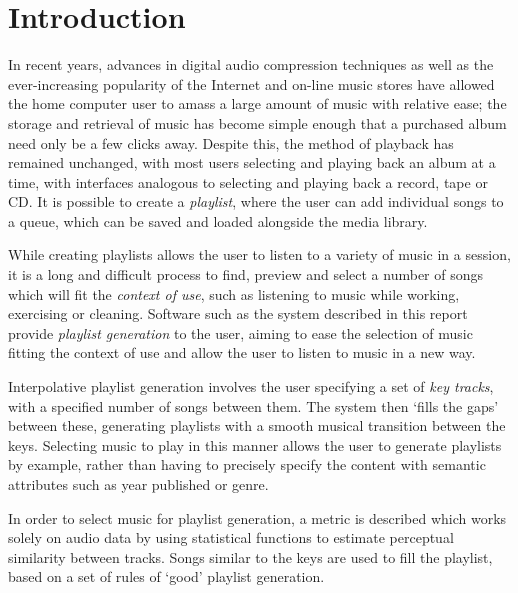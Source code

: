 \chapter{Introduction}
\begin{comment}
	\item rationale
	\item purpose
	\item issues
	\item context
	\item relevance
	\item structure of dissertation
\end{comment}
In recent years, advances in digital audio compression techniques as well as the ever-increasing popularity of the Internet and on-line music stores have allowed the home computer user to amass a large amount of music with relative ease; the storage and retrieval of music has become simple enough that a purchased album need only be a few clicks away. Despite this, the method of playback has remained unchanged, with most users selecting and playing back an album at a time, with interfaces analogous to selecting and playing back a record, tape or CD. It is possible to create a \emph{playlist}, where the user can add individual songs to a queue, which can be saved and loaded alongside the media library.

While creating playlists allows the user to listen to a variety of music in a session, it is a long and difficult process to find, preview and select a number of songs which will fit the \emph{context of use}, such as listening to music while working, exercising or cleaning. Software such as the system described in this report provide \emph{playlist generation} to the user, aiming to ease the selection of music fitting the context of use and allow the user to listen to music in a new way.

Interpolative playlist generation involves the user specifying a set of \emph{key tracks}, with a specified number of songs between them. The system then `fills the gaps' between these, generating playlists with a smooth musical transition between the keys. Selecting music to play in this manner allows the user to generate playlists by example, rather than having to precisely specify the content with semantic attributes such as year published or genre.

In order to select music for playlist generation, a metric is described which works solely on audio data by using statistical functions to estimate perceptual similarity between tracks. Songs similar to the keys are used to fill the playlist, based on a set of rules of `good' playlist generation.

